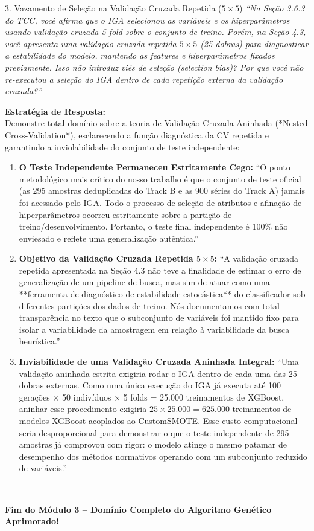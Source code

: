 \documentclass[11pt,a4paper]{article}
\begin{document}
\begin{boardQuestion}{3. Vazamento de Seleção na Validação Cruzada Repetida ($5 \times 5$)}
\textit{“Na Seção 3.6.3 do TCC, você afirma que o IGA selecionou as variáveis e os hiperparâmetros usando validação cruzada 5-fold sobre o conjunto de treino. Porém, na Seção 4.3, você apresenta uma validação cruzada repetida $5 \times 5$ (25 dobras) para diagnosticar a estabilidade do modelo, mantendo as features e hiperparâmetros fixados previamente. Isso não introduz viés de seleção (selection bias)? Por que você não re-executou a seleção do IGA dentro de cada repetição externa da validação cruzada?”}
\end{boardQuestion}

\begin{boardAnswer}
\textbf{Estratégia de Resposta:}\\
Demonstre total domínio sobre a teoria de Validação Cruzada Aninhada (*Nested Cross-Validation*), esclarecendo a função diagnóstica da CV repetida e garantindo a inviolabilidade do conjunto de teste independente:

\begin{enumerate}[leftmargin=0.8cm]
  \item \textbf{O Teste Independente Permaneceu Estritamente Cego:} ``O ponto metodológico mais crítico do nosso trabalho é que o conjunto de teste oficial (as 295 amostras deduplicadas do Track B e as 900 séries do Track A) jamais foi acessado pelo IGA. Todo o processo de seleção de atributos e afinação de hiperparâmetros ocorreu estritamente sobre a partição de treino/desenvolvimento. Portanto, o teste final independente é 100\% não enviesado e reflete uma generalização autêntica.''
  \item \textbf{Objetivo da Validação Cruzada Repetida $5 \times 5$:} ``A validação cruzada repetida apresentada na Seção 4.3 não teve a finalidade de estimar o erro de generalização de um pipeline de busca, mas sim de atuar como uma **ferramenta de diagnóstico de estabilidade estocástica** do classificador sob diferentes partições dos dados de treino. Nós documentamos com total transparência no texto que o subconjunto de variáveis foi mantido fixo para isolar a variabilidade da amostragem em relação à variabilidade da busca heurística.''
  \item \textbf{Inviabilidade de uma Validação Cruzada Aninhada Integral:} ``Uma validação aninhada estrita exigiria rodar o IGA dentro de cada uma das 25 dobras externas. Como uma única execução do IGA já executa até 100 gerações $\times$ 50 indivíduos $\times$ 5 folds = 25.000 treinamentos de XGBoost, aninhar esse procedimento exigiria $25 \times 25.000 = \mathbf{625.000}$ treinamentos de modelos XGBoost acoplados ao CustomSMOTE. Esse custo computacional seria desproporcional para demonstrar o que o teste independente de 295 amostras já comprovou com rigor: o modelo atinge o mesmo patamar de desempenho dos métodos normativos operando com um subconjunto reduzido de variáveis.''
\end{enumerate}
\end{boardAnswer}

\vspace{0.6cm}
\begin{center}
  \rule{0.6\textwidth}{0.8pt}\\[0.2cm]
  \small\textbf{\textsf{Fim do Módulo 3 -- Domínio Completo do Algoritmo Genético Aprimorado!}}
\end{center}
\end{document}
